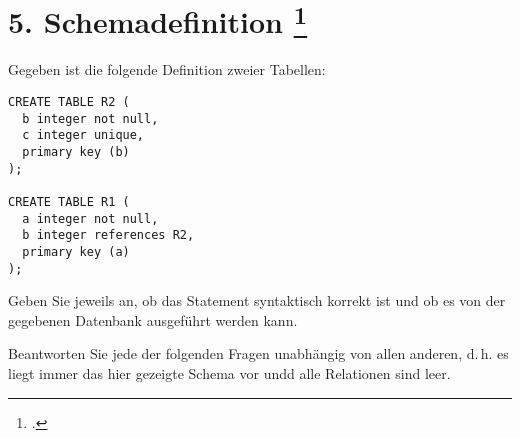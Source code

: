 \documentclass{lehramt-informatik-aufgabe}
\begin{document}
\section{5. Schemadefinition
\footcite{66116:2017:09}}

Gegeben ist die folgende Definition zweier Tabellen:

\begin{verbatim}
CREATE TABLE R2 (
  b integer not null,
  c integer unique,
  primary key (b)
);

CREATE TABLE R1 (
  a integer not null,
  b integer references R2,
  primary key (a)
);
\end{verbatim}

Geben Sie jeweils an, ob das Statement syntaktisch korrekt ist und ob es
von der gegebenen Datenbank ausgeführt werden kann.

Beantworten Sie jede der folgenden Fragen unabhängig von allen anderen,
d.\,h. es liegt immer das hier gezeigte Schema vor undd alle Relationen
sind leer.
\end{document}
